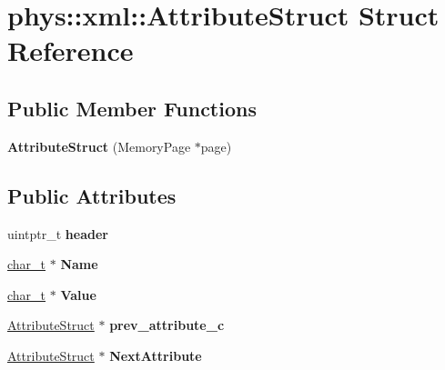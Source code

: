 \hypertarget{structphys_1_1xml_1_1AttributeStruct}{
\section{phys::xml::AttributeStruct Struct Reference}
\label{dd/dfe/structphys_1_1xml_1_1AttributeStruct}
}
\subsection*{Public Member Functions}
\begin{DoxyCompactItemize}
\item 
\hypertarget{structphys_1_1xml_1_1AttributeStruct_ae56b37b04de2de9b06f2ab62063860d0}{
{\bfseries AttributeStruct} (MemoryPage $\ast$page)}
\label{dd/dfe/structphys_1_1xml_1_1AttributeStruct_ae56b37b04de2de9b06f2ab62063860d0}

\end{DoxyCompactItemize}
\subsection*{Public Attributes}
\begin{DoxyCompactItemize}
\item 
\hypertarget{structphys_1_1xml_1_1AttributeStruct_a9fd6577532fd75614cbbeef25ebc483d}{
uintptr\_\-t {\bfseries header}}
\label{dd/dfe/structphys_1_1xml_1_1AttributeStruct_a9fd6577532fd75614cbbeef25ebc483d}

\item 
\hypertarget{structphys_1_1xml_1_1AttributeStruct_af33547ea3e8c21d16737fc7ebcb94c95}{
\hyperlink{namespacephys_1_1xml_afc87705cd1c2917d87b879715a2d8f6e}{char\_\-t} $\ast$ {\bfseries Name}}
\label{dd/dfe/structphys_1_1xml_1_1AttributeStruct_af33547ea3e8c21d16737fc7ebcb94c95}

\item 
\hypertarget{structphys_1_1xml_1_1AttributeStruct_a2a7018296eb97ef342b5230d59f6e6ee}{
\hyperlink{namespacephys_1_1xml_afc87705cd1c2917d87b879715a2d8f6e}{char\_\-t} $\ast$ {\bfseries Value}}
\label{dd/dfe/structphys_1_1xml_1_1AttributeStruct_a2a7018296eb97ef342b5230d59f6e6ee}

\item 
\hypertarget{structphys_1_1xml_1_1AttributeStruct_ad37be3bf8c8d5a469396e882af402f89}{
\hyperlink{structphys_1_1xml_1_1AttributeStruct}{AttributeStruct} $\ast$ {\bfseries prev\_\-attribute\_\-c}}
\label{dd/dfe/structphys_1_1xml_1_1AttributeStruct_ad37be3bf8c8d5a469396e882af402f89}

\item 
\hypertarget{structphys_1_1xml_1_1AttributeStruct_a7e09b9d6ab866d16c1c1b5ec9aa4662f}{
\hyperlink{structphys_1_1xml_1_1AttributeStruct}{AttributeStruct} $\ast$ {\bfseries NextAttribute}}
\label{dd/dfe/structphys_1_1xml_1_1AttributeStruct_a7e09b9d6ab866d16c1c1b5ec9aa4662f}

\end{DoxyCompactItemize}


